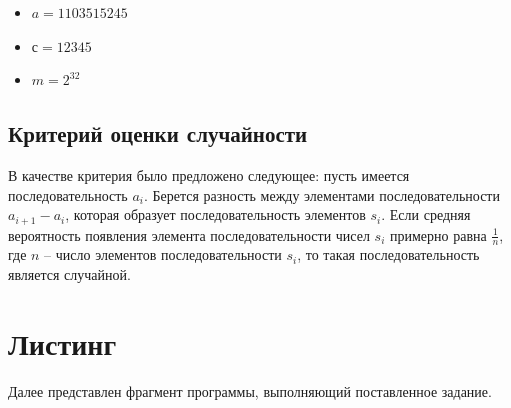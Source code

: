 \documentclass[12pt]{report}
\begin{document}
\begin{itemize}
	\item $a=1103515245$
	\item $с=12345$
	\item $m=2^{32}$
\end{itemize}


\subsection*{Критерий оценки случайности}

В качестве критерия было предложено следующее: пусть имеется последовательность $a_i$. Берется разность между элементами последовательности $a_{i+1} - a_i$, которая образует последовательность элементов $s_i$. Если средняя вероятность появления элемента последовательности чисел $s_i$ примерно равна $\frac{1}{n}$, где $n$ -- число элементов последовательности $s_i$, то такая последовательность является случайной.

\section{Листинг}

Далее представлен фрагмент программы, выполняющий поставленное задание.
\end{document}
